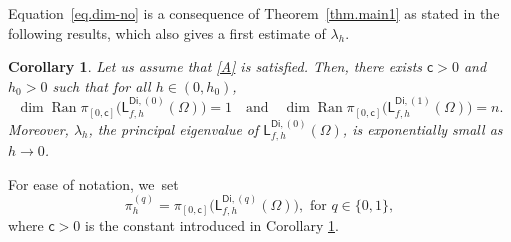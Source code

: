 \documentclass[JEP,XML,SOM,Unicode,NoEqCountersInSection,NoFloatCountersInSection,published]{cedram}
\newcommand{\quand}{\quad\text{and}\quad}
\DeclareMathOperator{\range}{Ran}\let\Ran\range
\theoremstyle{plain}
\newtheorem{corollary}[proposition]{Corollary}
\theoremstyle{definition}
\begin{document}
Equation~\eqref{eq.dim-no} is a consequence of Theorem~\ref{thm.main1} as stated in the following results, which also gives a first estimate of $\lambda_h$.
\begin{corollary}\label{thm-pc}
Let us assume that \ref{A} is satisfied. Then, there exists $\mathsf c>0$ and $h_0>0$ such that for all $h \in (0,h_0)$,
\[
\dim \range \pi_{[0,\mathsf c]} \bigl(\mathsf L^{\mathsf{Di},(0)}_{f,h}(\Omega)\bigr)
=1 \quand \dim \range \pi_{[0,\mathsf c]} \bigl(\mathsf L^{\mathsf{Di},(1)}_{f,h}(\Omega)\bigr) =n.
\]
Moreover, $\lambda_h$, the principal eigenvalue of $\mathsf L^{\mathsf{Di},(0)}_{f,h}(\Omega)$, is exponentially small as $h\to 0$.
\end{corollary}

For ease of notation, we~set
\begin{equation}
\label{eq.proj}
\pi_h^{(q)}= \pi_{[0,\mathsf c]} \bigl(\mathsf L^{\mathsf{Di},(q)}_{f,h}(\Omega)\bigr), \text{ for $q\in \{0,1\}$},
\end{equation}
where $\mathsf c>0$ is the constant introduced in Corollary \ref{thm-pc}.
\end{document}
